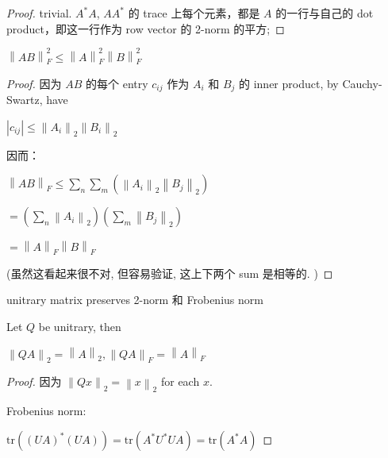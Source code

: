 \begin{proof}

trivial. \(A^{\ast}A\), \(AA^{\ast}\) 的 trace 上每个元素，都是 \(A\) 的一行与自己的 dot product，即这一行作为 row vector 的 2-norm 的平方;

\end{proof}

\begin{proposition}

\(\left\| {AB} \right\|_{F}^{2} \leq \left\| A \right\|_{F}^{2}\left\| B \right\|_{F}^{2}\)

\end{proposition}

\begin{proof}

因为 \(AB\) 的每个 entry \(c_{ij}\) 作为 \(A_{i}\) 和 \(B_{j}\) 的 inner product, by Cauchy-Swartz, have

\(\left| c_{ij} \right| \leq \left\| A_{i} \right\|_{2}\left\| B_{i} \right\|_{2}\)

因而：

\(\left\| {AB} \right\|_{F} \leq \sum_{n}\sum_{m}\left( {\left\| A_{i} \right\|_{2}\left\| B_{j} \right\|_{2}} \right)\)

\(= \left( {\sum_{n}\left\| A_{i} \right\|_{2}} \right)\left( {\sum_{m}\left\| B_{j} \right\|_{2}} \right)\)

\(= \left\| A \right\|_{F}\left\| B \right\|_{F}\)

(虽然这看起来很不对, 但容易验证, 这上下两个 sum 是相等的. )

\end{proof}

\begin{theorem}{unitrary matrix preserves 2-norm 和 Frobenius norm}

Let \(Q\) be unitrary, then

\(\left\| {QA} \right\|_{2} = \left\| A \right\|_{2},\left\| {QA} \right\|_{F} = \left\| A \right\|_{F}\)

\end{theorem}

\begin{proof}

因为 \(\left\| {Qx} \right\|_{2} = \left\| x \right\|_{2}\) for each \(x\).

Frobenius norm:

\(\text{tr}\left( {\left( {UA} \right)^{\ast}\left( {UA} \right)} \right) = \text{tr}\left( {A^{\ast}U^{\ast}UA} \right) = \text{tr}\left( {A^{\ast}A} \right)\)

\end{proof}
